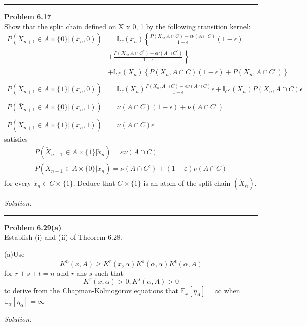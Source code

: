 \documentclass[a4paper, 11pt]{article}
\newenvironment{problem}[2][Problem]
    { \begin{mdframed}[backgroundcolor=gray!20] \textbf{#1 #2} \\}
    {  \end{mdframed}}
\newenvironment{solution}
    {\textit{Solution:}}
    {}
\begin{document}
\noindent\rule{7in}{2.8pt}
\begin{problem}{6.17}
Show that the split chain defined on X x {0, 1} by the following transition kernel: 
\begin{align*}
    P\left(\check{X}_{n+1} \in A \times\{0\} |\left(x_{n}, 0\right)\right) 
    &=\mathbb{I}_{C}\left(x_{n}\right)\left\{\frac{P\left(X_{n}, A \cap C\right)-\epsilon \nu(A \cap C)}{1-\epsilon}(1-\epsilon)\right. \\
    &\left.+\frac{P\left(X_{n}, A \cap C^{c}\right)-\epsilon \nu\left(A \cap C^{c}\right)}{1-\epsilon}\right\} \\
    &+\mathbb{I}_{C^{c}}\left(X_{n}\right)\left\{P\left(X_{n}, A \cap C\right)(1-\epsilon)+P\left(X_{n}, A \cap C^{c}\right)\right\} \\
    \\
    P\left(\check{X}_{n+1} \in A \times\{1\} |\left(x_{n}, 0\right)\right)
    &=\mathbb{I}_{C}\left(X_{n}\right) \frac{P\left(X_{n}, A \cap C\right)-\epsilon \nu(A \cap C)}{1-\epsilon} \epsilon+\mathbb{I}_{C^{c}}\left(X_{n}\right) P\left(X_{n}, A \cap C\right) \epsilon \\
    \\
    P\left(\bar{X}_{n+1} \in A \times\{0\} |\left(x_{n}, 1\right)\right)&=\nu(A \cap C)(1-\epsilon)+\nu\left(A \cap C^{c}\right) \\
    \\
    P\left(\tilde{X}_{n+1} \in A \times\{1\} |\left(x_{n}, 1\right)\right)&=\nu(A \cap C) \epsilon
\end{align*}
satisfies
$$\begin{array}{c}
    P\left(\check{X}_{n+1} \in A \times\{1\} | \check{x}_{n}\right)=\varepsilon \nu(A \cap C) \\
    P\left(\check{X}_{n+1} \in A \times\{0\} | \check{x}_{n}\right)=\nu\left(A \cap C^{c}\right)+(1-\varepsilon) \nu(A \cap C)
    \end{array}$$
for every $\check{x}_{n} \in C \times\{1\} .$ Deduce that $C \times\{1\}$ is an atom of the split chain $\left(\check{X}_{n}\right)$.
\end{problem}
\begin{solution}

\end{solution}

\noindent\rule{7in}{2.8pt}
\begin{problem}{6.29(a)}
Establish (i) and (ii) of Theorem 6.28. 

(a)Use
$$K^{n}(x, A) \geq K^{r}(x, \alpha) K^{s}(\alpha, \alpha) K^{t}(\alpha, A)$$
for $r+s+t=n$ and $r$ ans $s$ such that
$$K^r(x,\alpha)>0,K^s(\alpha,A)>0$$
to derive from the Chapman-Kolmogorov equations that $\mathbb{E}_{x}\left[\eta_{A}\right]=\infty$ when $\mathbb{E}_{\alpha}\left[\eta_{\alpha}\right]=\infty$
\end{problem}
\begin{solution}

\end{solution}
\end{document}
